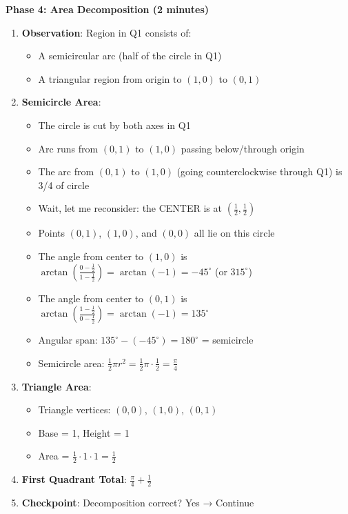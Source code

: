 \documentclass[]{article}
\begin{document}
\begin{solutionbox}
\textbf{Phase 4: Area Decomposition (2 minutes)}
\begin{enumerate}[leftmargin=*]
    \item \textbf{Observation}: Region in Q1 consists of:
    \begin{itemize}
        \item A semicircular arc (half of the circle in Q1)
        \item A triangular region from origin to $(1,0)$ to $(0,1)$
    \end{itemize}
    
    \item \textbf{Semicircle Area}:
    \begin{itemize}
        \item The circle is cut by both axes in Q1
        \item Arc runs from $(0,1)$ to $(1,0)$ passing below/through origin
        \item The arc from $(0,1)$ to $(1,0)$ (going counterclockwise through Q1) is 3/4 of circle
        \item Wait, let me reconsider: the CENTER is at $(\frac{1}{2}, \frac{1}{2})$
        \item Points $(0,1)$, $(1,0)$, and $(0,0)$ all lie on this circle
        \item The angle from center to $(1,0)$ is $\arctan(\frac{0-\frac{1}{2}}{1-\frac{1}{2}}) = \arctan(-1) = -45^\circ$ (or $315^\circ$)
        \item The angle from center to $(0,1)$ is $\arctan(\frac{1-\frac{1}{2}}{0-\frac{1}{2}}) = \arctan(-1) = 135^\circ$
        \item Angular span: $135^\circ - (-45^\circ) = 180^\circ$ = semicircle
        \item Semicircle area: $\frac{1}{2} \pi r^2 = \frac{1}{2} \pi \cdot \frac{1}{2} = \frac{\pi}{4}$
    \end{itemize}
    
    \item \textbf{Triangle Area}:
    \begin{itemize}
        \item Triangle vertices: $(0,0)$, $(1,0)$, $(0,1)$
        \item Base = 1, Height = 1
        \item Area = $\frac{1}{2} \cdot 1 \cdot 1 = \frac{1}{2}$
    \end{itemize}
    
    \item \textbf{First Quadrant Total}: $\frac{\pi}{4} + \frac{1}{2}$
    \item \textbf{Checkpoint}: Decomposition correct? Yes → Continue
\end{enumerate}


\end{solutionbox}
\end{document}
